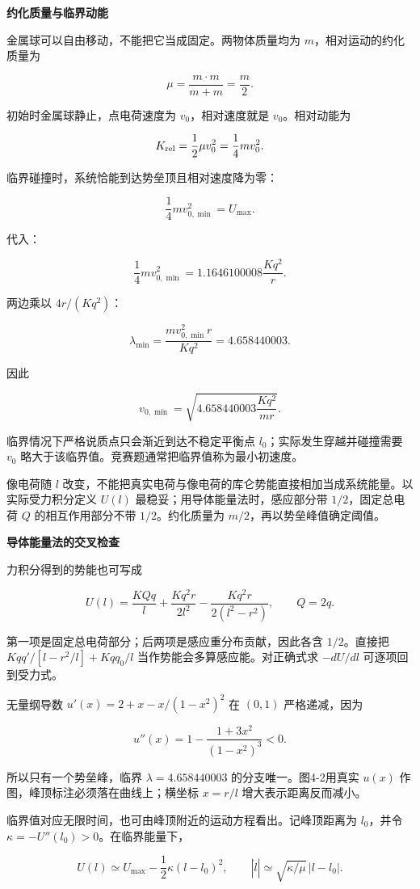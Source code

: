 \documentclass[12pt,a4paper,UTF8]{ctexart}
\begin{document}
\textbf{约化质量与临界动能}

金属球可以自由移动，不能把它当成固定。两物体质量均为
\(m\)，相对运动的约化质量为

\[\mu=\frac{m\cdot m}{m+m}=\frac m2.\]

初始时金属球静止，点电荷速度为 \(v_0\)，相对速度就是 \(v_0\)。相对动能为

\[K_{\rm rel}=\frac12\mu v_0^2=\frac14mv_0^2.\]

临界碰撞时，系统恰能到达势垒顶且相对速度降为零：

\[\frac14mv_{0,\min}^2=U_{\max}.\]

代入：

\[\frac14mv_{0,\min}^2
=1.1646100008\frac{Kq^2}{r}.\]

两边乘以 \(4r/(Kq^2)\)：

\[\boxed{
\lambda_{\min}
=\frac{mv_{0,\min}^2r}{Kq^2}
=4.658440003
}.\]

因此

\[\boxed{
v_{0,\min}
=\sqrt{4.658440003\frac{Kq^2}{mr}}
}.\]

临界情况下严格说质点只会渐近到达不稳定平衡点
\(l_0\)；实际发生穿越并碰撞需要 \(v_0\)
略大于该临界值。竞赛题通常把临界值称为最小初速度。

像电荷随 \(l\)
改变，不能把真实电荷与像电荷的库仑势能直接相加当成系统能量。以实际受力积分定义
\(U(l)\) 最稳妥；用导体能量法时，感应部分带 \(1/2\)，固定总电荷 \(Q\)
的相互作用部分不带 \(1/2\)。约化质量为 \(m/2\)，再以势垒峰值确定阈值。

\textbf{导体能量法的交叉检查}

力积分得到的势能也可写成

\[U(l)=\frac{KQq}{l}
+\frac{Kq^2r}{2l^2}-\frac{Kq^2r}{2(l^2-r^2)},\qquad Q=2q.\]

第一项是固定总电荷部分；后两项是感应重分布贡献，因此各含 \(1/2\)。直接把
\(Kqq'/[l-r^2/l]+Kqq_0/l\) 当作势能会多算感应能。对正确式求 \(-dU/dl\)
可逐项回到受力式。

无量纲导数 \(u'(x)=2+x-x/(1-x^2)^2\) 在 \((0,1)\) 严格递减，因为

\[u''(x)=1-\frac{1+3x^2}{(1-x^2)^3}<0.\]

所以只有一个势垒峰，临界 \(\lambda=4.658440003\) 的分支唯一。图4-2用真实
\(u(x)\) 作图，峰顶标注必须落在曲线上；横坐标 \(x=r/l\)
增大表示距离反而减小。

临界值对应无限时间，也可由峰顶附近的运动方程看出。记峰顶距离为
\(l_0\)，并令 \(\kappa=-U''(l_0)>0\)。在临界能量下，

\[U(l)\simeq U_{\max}-\frac12\kappa(l-l_0)^2,
\qquad |\dot l|\simeq\sqrt{\kappa/\mu}\,|l-l_0|.\]
\end{document}
